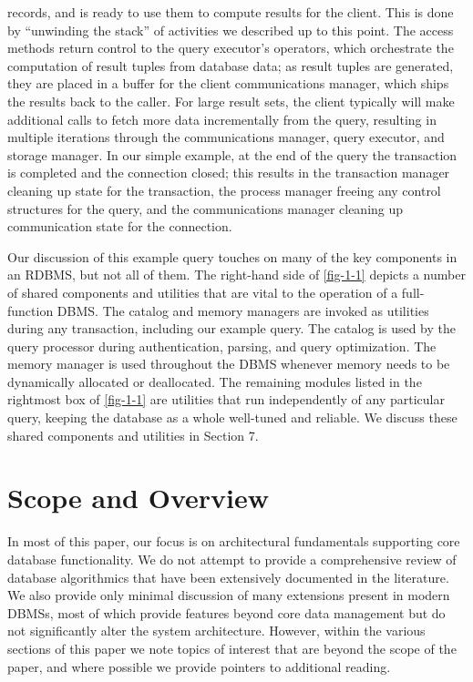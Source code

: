 \documentclass[b5paper,11pt,twoside,openright]{book}
\begin{document}
\begin{enumerate}
  records, and is ready to use them to compute results for the client.
  This is done by ``unwinding the stack'' of activities we described up
  to this point. The access methods return control to the query
  executor's operators, which orchestrate the computation of result
  tuples from database data; as result tuples are generated, they are
  placed in a buffer for the client communications manager, which ships
  the results back to the caller. For large result sets, the client
  typically will make additional calls to fetch more data incrementally
  from the query, resulting in multiple iterations through the
  communications manager, query executor, and storage manager. In our
  simple example, at the end of the query the transaction is completed
  and the connection closed; this results in the transaction manager
  cleaning up state for the transaction, the process manager freeing any
  control structures for the query, and the communications manager
  cleaning up communication state for the connection.
\end{enumerate}

Our discussion of this example query touches on many of the key
components in an RDBMS, but not all of them. The right-hand side of
\autoref{fig-1-1} depicts a number of shared components and utilities that are
vital to the operation of a full-function DBMS. The catalog and memory
managers are invoked as utilities during any transaction, including our
example query. The catalog is used by the query processor during
authentication, parsing, and query optimization. The memory manager is
used throughout the DBMS whenever memory needs to be dynamically
allocated or deallocated. The remaining modules listed in the rightmost
box of \autoref{fig-1-1} are utilities that run independently of any particular
query, keeping the database as a whole well-tuned and reliable. We
discuss these shared components and utilities in Section 7.

\hypertarget{scope-and-overview}{%
\section{Scope and Overview}\label{scope-and-overview}}

In most of this paper, our focus is on architectural fundamentals
supporting core database functionality. We do not attempt to provide a
comprehensive review of database algorithmics that have been extensively
documented in the literature. We also provide only minimal discussion of
many extensions present in modern DBMSs, most of which provide features
beyond core data management but do not significantly alter the system
architecture. However, within the various sections of this paper we note
topics of interest that are beyond the scope of the paper, and where
possible we provide pointers to additional reading.
\end{document}
